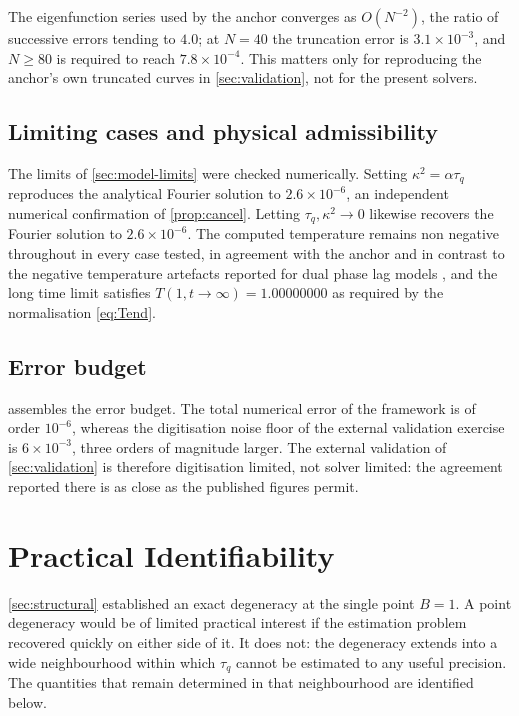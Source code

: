 \documentclass[preprint,12pt,a4paper]{elsarticle}
\theoremstyle{plain}
\theoremstyle{definition}
\theoremstyle{remark}
\newcommand{\tq}{\tau_{q}}
\newcommand{\kk}{\kappa^{2}}
\newcommand{\Bnum}{B}
\begin{document}
The eigenfunction series used by the anchor converges as $O(N^{-2})$, the ratio
of successive errors tending to $4.0$; at $N=40$ the truncation error is
$3.1\times10^{-3}$, and $N \geq 80$ is required to reach $7.8\times10^{-4}$.
This matters only for reproducing the anchor's own truncated curves in
\cref{sec:validation}, not for the present solvers.

\subsection{Limiting cases and physical admissibility}
\label{sec:cert-limits}

The limits of \cref{sec:model-limits} were checked numerically. Setting
$\kk = \alpha\tq$ reproduces the analytical Fourier solution to
$2.6\times10^{-6}$, an independent numerical confirmation of
\cref{prop:cancel}. Letting $\tq,\kk \to 0$ likewise recovers the Fourier
solution to $2.6\times10^{-6}$. The computed temperature remains non negative
throughout in every case tested, in agreement with the anchor and in contrast
to the negative temperature artefacts reported for dual phase lag models
\cite{Rukolaine2014}, and the long time limit satisfies
$T(1,t\to\infty) = 1.00000000$ as required by the normalisation
\eqref{eq:Tend}.

\subsection{Error budget}
\label{sec:cert-budget}

 assembles the error budget. The total numerical error
of the framework is of order $10^{-6}$, whereas the digitisation noise floor of
the external validation exercise is $6\times10^{-3}$, three orders of magnitude larger.
The external validation of \cref{sec:validation} is therefore
digitisation limited, not solver limited: the agreement reported there is as
close as the published figures permit.


\section{Practical Identifiability}
\label{sec:practical}

\cref{sec:structural} established an exact degeneracy at the single point
$\Bnum = 1$. A point degeneracy would be of limited practical interest if the
estimation problem recovered quickly on either side of it. It does not: the
degeneracy extends into a wide neighbourhood within which $\tq$ cannot be
estimated to any useful precision. The quantities that remain determined in that
neighbourhood are identified below.
\end{document}
